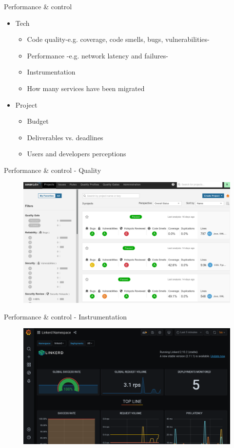 \documentclass[aspectratio=169]{beamer}
\begin{document}
\begin{frame}{Performance \& control}

\begin{itemize}
\item Tech
    \begin{itemize}
    \item Code quality-e.g. coverage, code smells, bugs, vulnerabilities-
    \item Performance -e.g. network latency and failures-
    \item Instrumentation
    \item How many services have been migrated 
    \end{itemize}
\item  Project
    \begin{itemize}
    \item Budget
    \item Deliverables vs. deadlines
    \item Users and developers perceptions
    \end{itemize}
\end{itemize}
\end{frame}

\begin{frame}{Performance \& control - Quality}
\begin{figure}
	\centering
	\includegraphics[width=0.8\linewidth]{Images/sonar}
\end{figure}
\end{frame}

\begin{frame}{Performance \& control - Instrumentation}
\begin{figure}
	\centering
	\includegraphics[width=0.8\linewidth]{Images/grafana}
\end{figure}
\end{frame}
\end{document}
